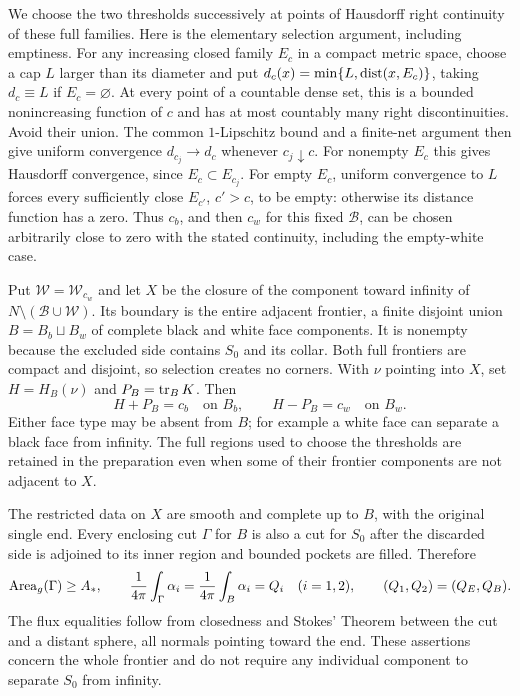 We choose the two thresholds successively at points of Hausdorff
right continuity of these full families.  Here is the elementary
selection argument, including emptiness.  For any increasing closed
family $E_c$ in a compact metric space, choose a cap $L$ larger than
its diameter and put
$d_c(x)=\min\{L,\operatorname{dist}(x,E_c)\}$, taking $d_c\equiv L$ if
$E_c=\varnothing$.  At every point of a countable dense set, this
is a bounded nonincreasing function of $c$ and has at most countably
many right discontinuities.  Avoid their union.  The common
$1$-Lipschitz bound and a finite-net argument then give uniform
convergence $d_{c_j}\to d_c$ whenever $c_j\downarrow c$.  For
nonempty $E_c$ this gives Hausdorff convergence, since
$E_c\subset E_{c_j}$.  For empty $E_c$, uniform convergence to $L$
forces every sufficiently close $E_{c'}$, $c'>c$, to be empty:
otherwise its distance function has a zero.  Thus $c_b$, and then
$c_w$ for this fixed $\mathcal B$, can be chosen arbitrarily close
to zero with the stated continuity, including the empty-white case.

Put $\mathcal W=\mathcal W_{c_w}$ and let $X$ be the closure of the
component toward infinity of $N\setminus(\mathcal B\cup\mathcal W)$.
Its boundary is the entire adjacent frontier, a finite disjoint
union $B=B_b\sqcup B_w$ of complete black and white face components.
It is nonempty because the excluded side contains $S_0$ and its
collar.  Both full frontiers are compact and disjoint, so selection
creates no corners.  With $\nu$ pointing into $X$, set
$H=H_B(\nu)$ and $P_B=\operatorname{tr}_BK$.  Then
\begin{equation}\label{ch:prep:faces}
 H+P_B=c_b\quad\text{on }B_b,
 \qquad H-P_B=c_w\quad\text{on }B_w.
\end{equation}
Either face type may be absent from $B$; for example a white face
can separate a black face from infinity.  The full regions used to
choose the thresholds are retained in the preparation even when
some of their frontier components are not adjacent to $X$.

The restricted data on $X$ are smooth and complete up to $B$, with
the original single end.  Every enclosing cut $\Gamma$ for $B$ is
also a cut for $S_0$ after the discarded side is adjoined to its
inner region and bounded pockets are filled.  Therefore
\begin{equation}\label{ch:prep:enclosure}
 \operatorname{Area}_g(\Gamma)\geq A_*,
 \qquad
 \frac1{4\pi}\int_\Gamma\alpha_i
   =\frac1{4\pi}\int_B\alpha_i=Q_i\quad(i=1,2),
 \qquad (Q_1,Q_2)=(Q_E,Q_B).
\end{equation}
The flux equalities follow from closedness and Stokes' Theorem
between the cut and a distant sphere, all normals pointing toward
the end.  These assertions concern the whole frontier and do not
require any individual component to separate $S_0$ from infinity.


